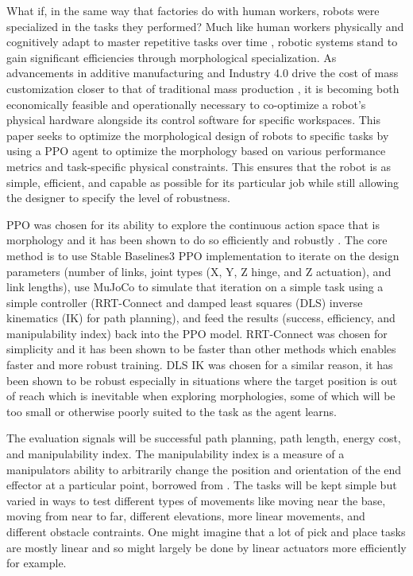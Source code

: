 \documentclass[defaultstyle,11pt]{thesis}
\begin{document}
What if, in the same way that factories do with human workers, robots were specialized in the tasks they performed?
Much like human workers physically and cognitively adapt to master repetitive tasks over time \cite{arany2008pgc1}\cite{mancuso2022effect}\cite{wu2020occupational}, robotic systems stand to gain significant efficiencies through morphological specialization. 
As advancements in additive manufacturing and Industry 4.0 drive the cost of mass customization closer to that of traditional mass production \cite{wang2017industry}\cite{baumers2019economics}, it is becoming both economically feasible and operationally necessary to co-optimize a robot's physical hardware alongside its control software for specific workspaces.
This paper seeks to optimize the morphological design of robots to specific tasks by using a PPO agent to optimize the morphology based on various performance metrics and task-specific physical constraints.
This ensures that the robot is as simple, efficient, and capable as possible for its particular job while still allowing the designer to specify the level of robustness.

PPO was chosen for its ability to explore the continuous action space that is morphology and it has been shown to do so efficiently and robustly \cite{schulman2017proximal}.
The core method is to use Stable Baselines3 PPO implementation to iterate on the design parameters (number of links, joint types (X, Y, Z hinge, and Z actuation), and link lengths), use MuJoCo to simulate that iteration on a simple task using a simple controller (RRT-Connect and damped least squares (DLS) inverse kinematics (IK) for path planning), and feed the results (success, efficiency, and manipulability index) back into the PPO model.
RRT-Connect was chosen for simplicity and it has been shown to be faster than other methods \cite{kuffner2000rrt} which enables faster and more robust training.
DLS IK was chosen for a similar reason, it has been shown to be robust especially in situations where the target position is out of reach \cite{buss2004introduction} which is inevitable when exploring morphologies, some of which will be too small or otherwise poorly suited to the task as the agent learns.

The evaluation signals will be successful path planning, path length, energy cost, and manipulability index.
The manipulability index is a measure of a manipulators ability to arbitrarily change the position and orientation of the end effector at a particular point, borrowed from \cite{yoshikawa1985manipulability}.
The tasks will be kept simple but varied in ways to test different types of movements like moving near the base, moving from near to far, different elevations, more linear movements, and different obstacle contraints.
One might imagine that a lot of pick and place tasks are mostly linear and so might largely be done by linear actuators more efficiently for example.
\end{document}
